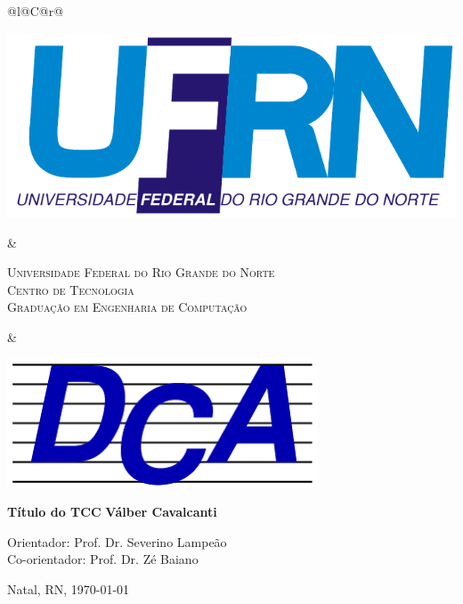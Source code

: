 %
%

\begin{titlepage}

\begin{center}

\small

\begin{tabularx}{\linewidth}{@{}l@{}C@{}r@{}}
\parbox[c]{3cm}{\includegraphics[width=\linewidth]{./figuras/UFRN}} &
\begin{center}
\textsf{\textsc{Universidade Federal do Rio Grande do Norte\\
Centro de Tecnologia\\
Graduação em Engenharia de Computação}}
\end{center} &
\parbox[c]{3cm}{\includegraphics[width=\linewidth]{./figuras/dca_logo.png}}
\end{tabularx}

\vfill
\LARGE
\textbf{Título do TCC}
\vfill
\Large
\textbf{Válber Cavalcanti}
\vfill

\normalsize

Orientador: Prof. Dr. Severino Lampeão
\\[2ex] Co-orientador: Prof. Dr. Zé Baiano %

\vfill

\hfill


\vfill

\large

Natal, RN, \today

\end{center}

\end{titlepage}